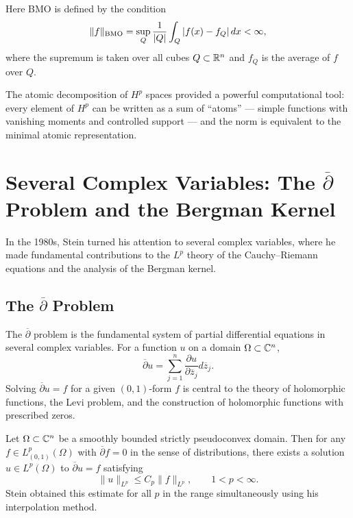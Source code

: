 Here BMO is defined by the condition
\[
\|f\|_{\operatorname{BMO}} = \sup_{Q} \frac{1}{|Q|} \int_Q |f(x) - f_Q|\,dx < \infty,
\]
where the supremum is taken over all cubes \(Q \subset \mathbb{R}^n\) and \(f_Q\) is the average of \(f\) over \(Q\).

The atomic decomposition of \(H^p\) spaces provided a powerful computational tool: every element of \(H^p\) can be written as a sum of ``atoms'' --- simple functions with vanishing moments and controlled support --- and the norm is equivalent to the minimal atomic representation.

\section{Several Complex Variables: The \texorpdfstring{\(\overline{\partial}\)}{d-bar} Problem and the Bergman Kernel}

In the 1980s, Stein turned his attention to several complex variables, where he made fundamental contributions to the \(L^p\) theory of the Cauchy--Riemann equations and the analysis of the Bergman kernel.

\subsection{The \texorpdfstring{\(\overline{\partial}\)}{d-bar} Problem}

The \(\overline{\partial}\) problem is the fundamental system of partial differential equations in several complex variables. For a function \(u\) on a domain \(\Omega \subset \mathbb{C}^n\),
\[
\overline{\partial} u = \sum_{j=1}^n \frac{\partial u}{\partial \overline{z}_j} d\overline{z}_j.
\]
Solving \(\overline{\partial} u = f\) for a given \((0,1)\)-form \(f\) is central to the theory of holomorphic functions, the Levi problem, and the construction of holomorphic functions with prescribed zeros.

\begin{theorem}
Let \(\Omega \subset \mathbb{C}^n\) be a smoothly bounded strictly pseudoconvex domain. Then for any \(f \in L^p_{(0,1)}(\Omega)\) with \(\overline{\partial} f = 0\) in the sense of distributions, there exists a solution \(u \in L^p(\Omega)\) to \(\overline{\partial} u = f\) satisfying
\[
\|u\|_{L^p} \leq C_p \|f\|_{L^p}, \qquad 1 < p < \infty.
\]
Stein obtained this estimate for all \(p\) in the range simultaneously using his interpolation method.
\end{theorem}

